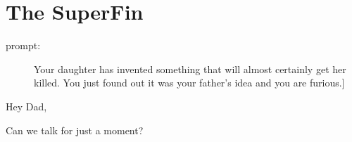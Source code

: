\section*{The SuperFin}

\begin{description}
\item[prompt:] Your daughter has invented something that will almost certainly get her killed. You just found out it was your father's idea and you are furious.]
\end{description}

\noindent Hey Dad,

Can we talk for just a moment?
